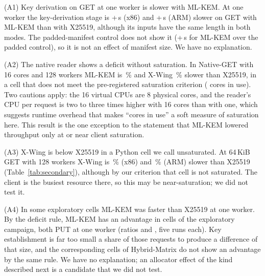 \documentclass[conference]{IEEEtran}
\newcommand{\lab}[1]{\textsf{#1}}
\begin{document}
(A1) Key derivation on GET at one worker is slower with ML-KEM. At one worker the key-derivation stage is
+\RevGetStageKdfDelta\,\textmu s (x86) and +\ArmGetStageKdfDelta\,\textmu s (ARM) slower on GET
with ML-KEM than with X25519, although its inputs have the same length in both modes. The
padded-manifest control does not show it (+\AudKdfOverPadGet\,\textmu s for ML-KEM over the
padded control), so it is not an effect of manifest size. We have no explanation.

(A2) The native reader shows a deficit without saturation. In \lab{Native-GET} with 16 cores and 128
workers ML-KEM is \AudNMidMlkemDeficit\,\% and X-Wing \AudNMidXwingDeficit\,\% slower than
X25519, in a cell that does not meet the pre-registered saturation criterion
(\AudNMidCores{} cores in use). Two cautions apply: the 16 virtual CPUs are 8 physical cores, and
the reader's CPU per request is two to three times higher with 16 cores than with one, which
suggests runtime overhead that makes ``cores in use'' a soft measure of saturation here. This
result is the one exception to the statement that ML-KEM lowered throughput only at or near
client saturation.

(A3) X-Wing is below X25519 in a Python cell we call unsaturated. At 64\,KiB GET with 128
workers X-Wing is \RevXwingMidDeficit\,\% (x86) and \ArmXwingMidDeficit\,\% (ARM) slower than
X25519 (Table~\ref{tab:secondary}), although by our criterion that cell is not saturated. The
client is the busiest resource there, so this may be near-saturation; we did not test it.

(A4) In some exploratory cells ML-KEM was faster than X25519 at one worker. By the deficit rule, ML-KEM has an
advantage in \AudSweepAdvantages{} cells of the exploratory campaign, both PUT at one worker
(ratios \AudSweepAdvantageLo{} and \AudSweepAdvantageHi, five runs each). Key establishment is
far too small a share of those requests to produce a difference of that size, and the
corresponding cells of \lab{Hybrid-Matrix} do not show an advantage by the same rule. We have
no explanation; an allocator effect of the kind described next is a candidate that we did not
test.
\end{document}
